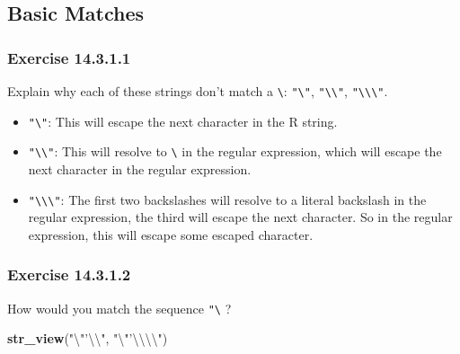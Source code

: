 \documentclass[]{book}
\newenvironment{Shaded}{\begin{snugshade}}{\end{snugshade}}
\newcommand{\CharTok}[1]{\textcolor[rgb]{0.31,0.60,0.02}{#1}}
\newcommand{\KeywordTok}[1]{\textcolor[rgb]{0.13,0.29,0.53}{\textbf{#1}}}
\newcommand{\NormalTok}[1]{#1}
\newcommand{\StringTok}[1]{\textcolor[rgb]{0.31,0.60,0.02}{#1}}
\providecommand{\tightlist}{%
  \setlength{\itemsep}{0pt}\setlength{\parskip}{0pt}}
\theoremstyle{plain}
\theoremstyle{remark}
\theoremstyle{definition}
\theoremstyle{definition}
\theoremstyle{definition}
\theoremstyle{remark}
\begin{document}
\hypertarget{basic-matches}{%
\subsection{Basic Matches}\label{basic-matches}}

\hypertarget{exercise-14.3.1.1}{%
\subsubsection*{\texorpdfstring{Exercise
{14.3.1.1}}{Exercise 14.3.1.1}}\label{exercise-14.3.1.1}}

Explain why each of these strings don't match a
\texttt{\textbackslash{}}: \texttt{"\textbackslash{}"},
\texttt{"\textbackslash{}\textbackslash{}"},
\texttt{"\textbackslash{}\textbackslash{}\textbackslash{}"}.

\begin{itemize}
\tightlist
\item
  \texttt{"\textbackslash{}"}: This will escape the next character in
  the R string.
\item
  \texttt{"\textbackslash{}\textbackslash{}"}: This will resolve to
  \texttt{\textbackslash{}} in the regular expression, which will escape
  the next character in the regular expression.
\item
  \texttt{"\textbackslash{}\textbackslash{}\textbackslash{}"}: The first
  two backslashes will resolve to a literal backslash in the regular
  expression, the third will escape the next character. So in the
  regular expression, this will escape some escaped character.
\end{itemize}

\hypertarget{exercise-14.3.1.2}{%
\subsubsection*{\texorpdfstring{Exercise
{14.3.1.2}}{Exercise 14.3.1.2}}\label{exercise-14.3.1.2}}

How would you match the sequence
\texttt{"\textquotesingle{}\textbackslash{}} ?

\begin{Shaded}
\begin{Highlighting}[]
\KeywordTok{str_view}\NormalTok{(}\StringTok{"}\CharTok{\textbackslash{}"}\StringTok{'}\CharTok{\textbackslash{}\textbackslash{}}\StringTok{"}\NormalTok{, }\StringTok{"}\CharTok{\textbackslash{}"}\StringTok{'}\CharTok{\textbackslash{}\textbackslash{}\textbackslash{}\textbackslash{}}\StringTok{"}\NormalTok{)}
\end{Highlighting}
\end{Shaded}
\end{document}
